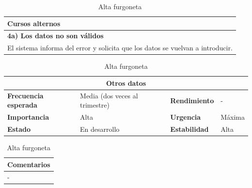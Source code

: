\documentclass[12pt,spanish]{article}
\begin{document}
\begin{table}[H]
\vspace{1cm}

\begin{tabular}{|m{10pt}|m{7.15cm}|m{10pt}|m{7.15cm}|}
\hline
\multicolumn{4}{|m{16.2cm}|}{\textbf{Cursos alternos}} \\
\hline
\multicolumn{4}{|m{16.2cm}|}{\textbf{4a) Los datos no son válidos}} \\
\hline
\multicolumn{4}{|m{16.2cm}|}{El sistema informa del error y solicita que los datos se vuelvan a introducir.} \\
\hline
\end{tabular}

\vspace{1cm}

\begin{tabular}{|m{3.72cm}|m{3.72cm}|m{3.72cm}|m{3.72cm}|}
\hline
\multicolumn{4}{|c|}{\textbf{Otros datos}} \\
\hline
\textbf{Frecuencia esperada} & Media (dos veces al trimestre) & \textbf{Rendimiento} & - \\
\hline
\textbf{Importancia} & Alta & \textbf{Urgencia} & Máxima \\
\hline
\textbf{Estado} & En desarrollo & \textbf{Estabilidad} & Alta \\
\hline
\end{tabular}

\vspace{1cm}

\begin{tabular}{|m{16.2cm}|}
\hline
\textbf{Comentarios} \\
\hline
- \\
\hline
\end{tabular}

\caption{Alta furgoneta}

\end{table}

\end{document}
